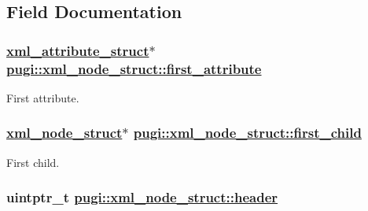 \subsection{Field Documentation}
\hypertarget{structpugi_1_1xml__node__struct_482d2daf97ce0745661cb2c57d8f6fb3}{
\subsubsection[first\_\-attribute]{\setlength{\rightskip}{0pt plus 5cm}\hyperlink{structpugi_1_1xml__attribute__struct}{xml\_\-attribute\_\-struct}$\ast$ \hyperlink{structpugi_1_1xml__node__struct_482d2daf97ce0745661cb2c57d8f6fb3}{pugi::xml\_\-node\_\-struct::first\_\-attribute}}}
\label{structpugi_1_1xml__node__struct_482d2daf97ce0745661cb2c57d8f6fb3}


First attribute. 

\hypertarget{structpugi_1_1xml__node__struct_f72c49a0f81928ef664d9d2f0260f23d}{
\subsubsection[first\_\-child]{\setlength{\rightskip}{0pt plus 5cm}\hyperlink{structpugi_1_1xml__node__struct}{xml\_\-node\_\-struct}$\ast$ \hyperlink{structpugi_1_1xml__node__struct_f72c49a0f81928ef664d9d2f0260f23d}{pugi::xml\_\-node\_\-struct::first\_\-child}}}
\label{structpugi_1_1xml__node__struct_f72c49a0f81928ef664d9d2f0260f23d}


First child. 

\hypertarget{structpugi_1_1xml__node__struct_ea2e405a368dc5a278a2d23465f1975c}{
\subsubsection[header]{\setlength{\rightskip}{0pt plus 5cm}uintptr\_\-t \hyperlink{structpugi_1_1xml__node__struct_ea2e405a368dc5a278a2d23465f1975c}{pugi::xml\_\-node\_\-struct::header}}}
\label{structpugi_1_1xml__node__struct_ea2e405a368dc5a278a2d23465f1975c}


